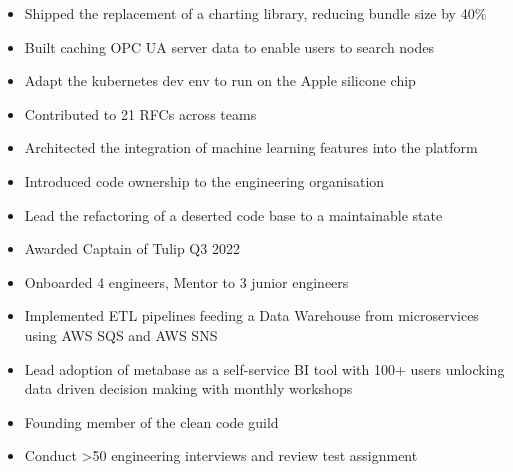 \documentclass[10pt,a4paper,ragged2e,withhyper]{altacv}
\begin{document}
\begin{paracol}{2}


\begin{itemize}
\item Shipped the replacement of a charting library, reducing bundle size by 40\%
\item Built caching OPC UA server data to enable users to search nodes
\item Adapt the kubernetes dev env to run on the Apple silicone chip

\item Contributed to 21 RFCs across teams
\item Architected the integration of machine learning features into the platform
\item Introduced code ownership to the engineering organisation
\item Lead the refactoring of a deserted code base to a maintainable state

\item Awarded Captain of Tulip Q3 2022
\item Onboarded 4 engineers, Mentor to 3 junior engineers
\end{itemize}


\divider

\begin{itemize}
\item Implemented ETL pipelines feeding a Data Warehouse from microservices using AWS SQS and AWS SNS
\item Lead adoption of metabase as a self-service BI tool with 100+ users unlocking data driven decision making with monthly workshops
\item Founding member of the clean code guild
\item Conduct >50 engineering interviews and review test assignment
\end{itemize}



\end{paracol}
\end{document}
